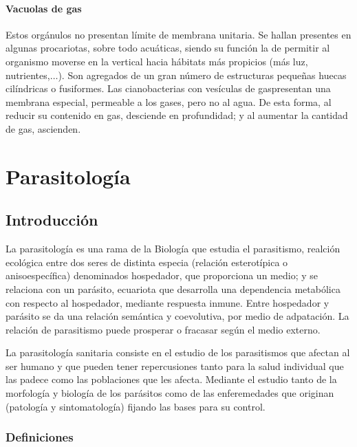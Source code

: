 \documentclass[10pt,a4paper,onecolumn,openany]{book}
\begin{document}
\subsection{Vacuolas de gas}
Estos orgánulos no presentan límite de membrana unitaria. Se hallan presentes en algunas procariotas, sobre todo acuáticas, siendo su función la de permitir al organismo moverse en la vertical hacia hábitats más propicios (más luz, nutrientes,$\dots$). Son agregados de un gran número de estructuras pequeñas huecas cilíndricas o fusiformes. Las cianobacterias con vesículas de gaspresentan una membrana especial, permeable a los gases, pero no al agua. De esta forma, al reducir su contenido en gas, desciende en profundidad; y al aumentar la cantidad de gas, ascienden.
\part{Parasitología}
\chapter{Introducción}
La parasitología es una rama de la Biología que estudia el parasitismo, realción ecológica entre dos seres de distinta especia (relación esterotípica o anisoespecífica) denominados hospedador, que proporciona un medio; y se relaciona con un parásito, ecuariota que desarrolla una dependencia metabólica con respecto al hospedador, mediante respuesta inmune. Entre hospedador y parásito se da una relación semántica y coevolutiva, por medio de adpatación. La relación de parasitismo puede prosperar o fracasar según el medio externo.

La parasitología sanitaria consiste en el estudio de los parasitismos que afectan al ser humano y que pueden tener repercusiones tanto para la salud individual que las padece como las poblaciones que les afecta. Mediante el estudio tanto de la morfología y biología de los parásitos como de las enferemedades que originan (patología y sintomatología) fijando las bases para su control.
\section{Definiciones}
\end{document}
